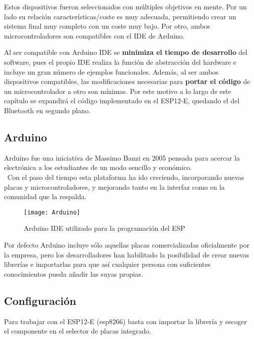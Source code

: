 Estos dispositivos fueron seleccionados con múltiples objetivos en mente. Por un lado su relación características/coste es muy adecuada, permitiendo crear un sistema final muy completo con un coste muy bajo. Por otro, ambos microcontroladores son compatibles con el IDE de Arduino.

Al ser compatible con Arduino \acrshort{IDE} se \textbf{minimiza el tiempo de desarrollo} del software, pues el propio IDE realiza la función de abstracción del hardware e incluye un gran número de ejemplos funcionales. Además, al ser ambos dispositivos compatibles, las modificaciones necesarias para \textbf{portar el código} de un microcontrolador a otro son mínimas. Por este motivo a lo largo de este capítulo se expandirá el código implementado en el ESP12-E, quedando el del Bluetooth en segundo plano.

\subsection{Arduino\label{sec:Software_Arduino}}

Arduino fue una iniciativa de Massimo Banzi en 2005 pensada para acercar la electrónica a los estudiantes de un modo sencillo y económico.\\\
Con el paso del tiempo esta plataforma ha ido creciendo, incorporando nuevas placas y microcontroladores, y mejorando tanto en la interfaz como en la comunidad que la respalda.

\begin{figure} [h]
    \centering
    \texttt{[image: Arduino]}
    \caption{Arduino IDE utilizado para la programación del ESP}
    \label{fig:Arduino}
\end{figure}

Por defecto Arduino incluye sólo aquellas placas comercializadas oficialmente por la empresa, pero los desarrolladores han habilitado la posibilidad de crear nuevas librerías e importarlas para que así cualquier persona con suficientes conocimientos pueda añadir las suyas propias.

\clearpage

\subsection{Configuración\label{sec:Software_Arduino_conf}}

Para trabajar con el ESP12-E (esp8266) basta con importar la librería y escoger el componente en el selector de placas integrado.

